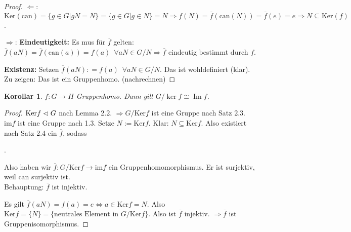 \documentclass[12pt,a4paper]{article}
\newcounter{thmcounter}[subsection]
\theoremstyle{definition}
\theoremstyle{remark}
\theoremstyle{definition}
\theoremstyle{definition}
\theoremstyle{plain}
\newtheorem{kor}[thmcounter]{Korollar}
\theoremstyle{plain}
\DeclareMathOperator{\im}{Im}
\begin{document}
\begin{proof}
	\glqq $\Leftarrow$\grqq: $\mbox{Ker}(\mbox{can}) = \{g\in G|gN = N\} = \{g\in G|g\in N\} = N \Rightarrow f(N) = \overline{f}(\mbox{can}(N)) = \overline{f}(e) = e\Rightarrow N\subseteq \mbox{Ker}(f)$.
	
	\noindent \glqq $\Rightarrow$\grqq: \textbf{Eindeutigkeit:} Es mus für $\overline{f}$ gelten: $\overline{f}(aN)=\overline{f}(\mbox{can}(a)) = f(a)\enspace \forall aN\in G/N\Rightarrow \overline{f}$ eindeutig bestimmt durch $f$.
	
	\textbf{Existenz:} Setzen $\overline{f}(aN): = f(a)\enspace \forall aN\in G/N$. Das ist wohldefiniert (klar). Zu zeigen: Das ist ein Gruppenhomo. (nachrechnen)
\end{proof}

\begin{kor}
	$f\colon G\to H$ Gruppenhomo. Dann gilt $G/\ker f \cong \im f$.
\end{kor}
\begin{proof}
	$\mbox{Ker}f\vartriangleleft G$ nach Lemma 2.2. $\Rightarrow G/\mbox{Ker}f$ ist eine Gruppe nach Satz 2.3. $\mbox{im}f$ ist eine Gruppe nach 1.3. Setze $N:= \mbox{Ker}f$. Klar: $N\subseteq \mbox{Ker}f$. Also existiert nach Satz 2.4 ein $\overline{f}$, sodass
	
	.
	
	Also haben wir $\overline{f}\colon G/\mbox{Ker}f\to \mbox{im}f$ ein Gruppenhomomorphismus. Er ist surjektiv, weil $\mbox{can}$ surjektiv ist. \\
	Behauptung: $\overline{f}$ ist injektiv.
	
	Es gilt $\overline{f}(aN)=f(a) = e \Leftrightarrow a\in \mbox{Ker}f = N$. Also $\mbox{Ker}\overline{f} = \{N\} = \{\mbox{neutrales Element in }G/\mbox{Ker}f\}$. Also ist $\overline{f}$ injektiv. $\Rightarrow \overline{f}$ ist Gruppenisomorphismus.
\end{proof}
\end{document}
